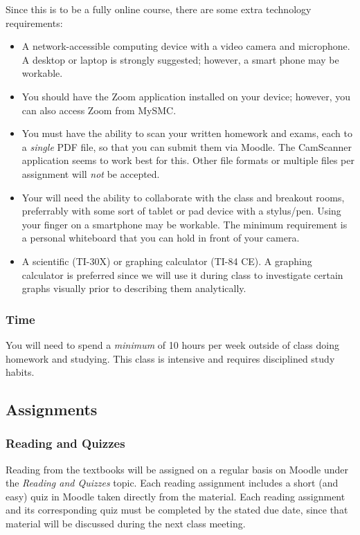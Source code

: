 \documentclass[letterpaper,12pt,fleqn]{article}
\begin{document}
Since this is to be a fully online course, there are some extra technology requirements:
\begin{itemize}
\item A network-accessible computing device with a video camera and microphone.  A desktop or laptop is strongly
  suggested; however, a smart phone may be workable.
\item You should have the Zoom application installed on your device; however, you can also access Zoom from MySMC.
\item You must have the ability to scan your written homework and exams, each to a \emph{single} PDF file, so that you
  can submit them via Moodle.  The CamScanner application seems to work best for this.  Other file formats or multiple
  files per assignment will \emph{not} be accepted.
\item Your will need the ability to collaborate with the class and breakout rooms, preferrably with some sort of
  tablet or pad device with a stylus/pen.  Using your finger on a smartphone may be workable.  The minimum
  requirement is a personal whiteboard that you can hold in front of your camera.
\item A scientific (TI-30X) or graphing calculator (TI-84 CE).  A graphing calculator is preferred since we will
  use it during class to investigate certain graphs visually prior to describing them analytically.
\end{itemize}

\subsubsection*{Time}

You will need to spend a \emph{minimum} of 10 hours per week outside of class doing homework and studying. This
class is intensive and requires disciplined study habits.

\subsection*{Assignments}

\subsubsection*{Reading and Quizzes}

Reading from the textbooks will be assigned on a regular basis on Moodle under the \emph{Reading and Quizzes} topic.
Each reading assignment includes a short (and easy) quiz in Moodle taken directly from the material.  Each reading
assignment and its corresponding quiz must be completed by the stated due date, since that material will be
discussed during the next class meeting.
\end{document}
